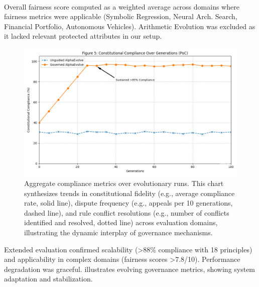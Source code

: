 \documentclass[manuscript,screen,9pt]{acmart}
\begin{document}
\begin{table}[htbp]
\begin{minipage}{\linewidth}\footnotesize \textsuperscript{\dag}Overall fairness score computed as a weighted average across domains where fairness metrics were applicable (Symbolic Regression, Neural Arch. Search, Financial Portfolio, Autonomous Vehicles). Arithmetic Evolution was excluded as it lacked relevant protected attributes in our setup.\end{minipage}
\end{table}

\FloatBarrier %
\begin{figure}[!htb]
\centering
\includegraphics[width=\linewidth,keepaspectratio]{figs/Figure_5_compliance_generations.png}
\caption{Aggregate compliance metrics over evolutionary runs. This chart synthesizes trends in constitutional fidelity (e.g., average compliance rate, solid line), dispute frequency (e.g., appeals per 10 generations, dashed line), and rule conflict resolutions (e.g., number of conflicts identified and resolved, dotted line) across evaluation domains, illustrating the dynamic interplay of governance mechanisms.}
\label{fig:compliance-trends}
\end{figure}
Extended evaluation confirmed scalability (>88\% compliance with 18 principles) and applicability in complex domains (fairness scores >7.8/10). Performance degradation was graceful.  illustrates evolving governance metrics, showing system adaptation and stabilization.
\end{document}

